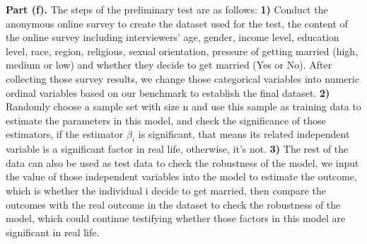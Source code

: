 \documentclass[letterpaper,12pt]{article}
\theoremstyle{definition}
\begin{document}
\noindent\textbf{Part (f).} The steps of the preliminary test are as follows: \textbf{1)} Conduct the anonymous online survey to create the dataset used for the test, the content of the online survey including interviewers' age, gender, income level, education level, race, region, religious, sexual orientation, pressure of getting married (high, medium or low) and whether they decide to get married (Yes or No). After collecting those survey results, we change those categorical variables into numeric ordinal variables based on our benchmark to establish the final dataset. \textbf{2)} Randomly choose a sample set with size n and use this sample as training data to estimate the parameters in this model, and check the significance of those estimators, if the estimator $\beta_{i}$ is significant, that means its related independent variable is a significant factor in real life, otherwise, it's not.  \textbf{3)} The rest of the data can also be used as test data to check the robustness of the model, we input the value of those independent variables into the model to estimate the outcome, which is whether the individual i decide to get married, then compare the outcomes with the real outcome in the dataset to check the robustness of the model, which could continue testifying whether those factors in this model are significant in real life.
\end{document}
